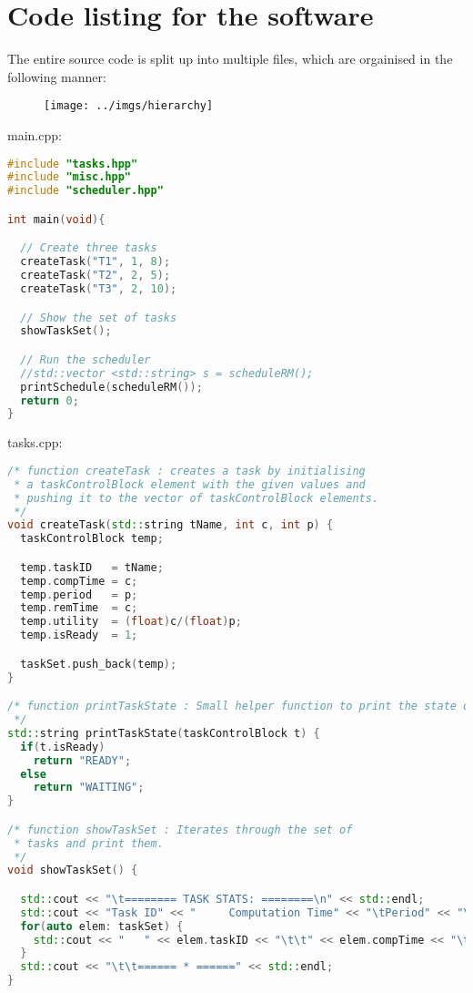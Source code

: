 \section*{Code listing for the software}

The entire source code is split up into multiple files, which are orgainised in the following manner:
\begin{figure}[h!]
	\centering
	\texttt{[image: ../imgs/hierarchy]}
\end{figure}

main.cpp:
\begin{lstlisting}[language=C++, frame=single]
#include "tasks.hpp"
#include "misc.hpp"
#include "scheduler.hpp"

int main(void){

  // Create three tasks
  createTask("T1", 1, 8);
  createTask("T2", 2, 5);
  createTask("T3", 2, 10);

  // Show the set of tasks
  showTaskSet();

  // Run the scheduler
  //std::vector <std::string> s = scheduleRM();
  printSchedule(scheduleRM());
  return 0;
}
\end{lstlisting}

tasks.cpp:

\begin{lstlisting}[language=C++, frame=single]
/* function createTask : creates a task by initialising
 * a taskControlBlock element with the given values and
 * pushing it to the vector of taskControlBlock elements.
 */
void createTask(std::string tName, int c, int p) {
  taskControlBlock temp;

  temp.taskID   = tName;
  temp.compTime = c;
  temp.period   = p;
  temp.remTime  = c;
  temp.utility  = (float)c/(float)p;
  temp.isReady  = 1;

  taskSet.push_back(temp);
}

/* function printTaskState : Small helper function to print the state of the task
 */
std::string printTaskState(taskControlBlock t) {
  if(t.isReady)
    return "READY";
  else
    return "WAITING";
}

/* function showTaskSet : Iterates through the set of
 * tasks and print them.
 */
void showTaskSet() {

  std::cout << "\t======== TASK STATS: ========\n" << std::endl;
  std::cout << "Task ID" << "     Computation Time" << "\tPeriod" << "\tUtility" << "\tState" << std::endl;
  for(auto elem: taskSet) {
    std::cout << "   " << elem.taskID << "\t\t" << elem.compTime << "\t\t" << elem.period << "\t" << elem.utility << "\t" << printTaskState(elem) << std::endl;
  }
  std::cout << "\t\t====== * ======" << std::endl;
}
\end{lstlisting}

